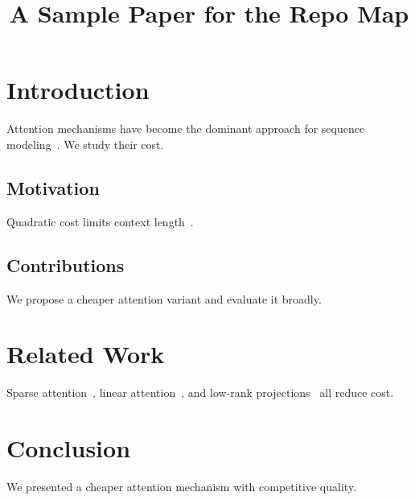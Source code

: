 \documentclass{article}
\title{A Sample Paper for the Repo Map}
\begin{document}
\section{Introduction}\label{sec:intro}
Attention mechanisms have become the dominant approach for sequence
modeling~\cite{vaswani2017attention}. We study their cost.

\subsection{Motivation}\label{sec:motivation}
Quadratic cost limits context length~\cite{child2019sparse}.

\subsection{Contributions}
We propose a cheaper attention variant and evaluate it broadly.

\section{Related Work}\label{sec:related}
Sparse attention~\cite{child2019sparse}, linear attention~\cite{katharopoulos2020linear},
and low-rank projections~\cite{wang2020linformer} all reduce cost.




\section{Conclusion}\label{sec:conclusion}
We presented a cheaper attention mechanism with competitive quality.
\end{document}
